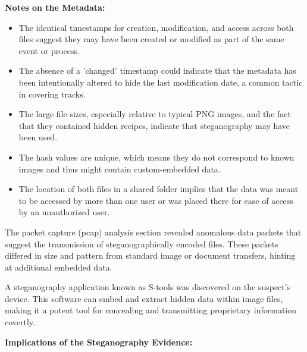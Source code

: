 \textbf{Notes on the Metadata:}
\begin{itemize}
    \item The identical timestamps for creation, modification, and access across both files suggest they may have been created or modified as part of the same event or process.
    \item The absence of a 'changed' timestamp could indicate that the metadata has been intentionally altered to hide the last modification date, a common tactic in covering tracks.
    \item The large file sizes, especially relative to typical PNG images, and the fact that they contained hidden recipes, indicate that steganography may have been used.
    \item The hash values are unique, which means they do not correspond to known images and thus might contain custom-embedded data.
    \item The location of both files in a shared folder implies that the data was meant to be accessed by more than one user or was placed there for ease of access by an unauthorized user.
\end{itemize}

The packet capture (pcap) analysis section revealed anomalous data packets that suggest the transmission of steganographically encoded files. These packets differed in size and pattern from standard image or document transfers, hinting at additional embedded data.

A steganography application known as S-tools was discovered on the suspect's device. This software can embed and extract hidden data within image files, making it a potent tool for concealing and transmitting proprietary information covertly.

\textbf{Implications of the Steganography Evidence:}

